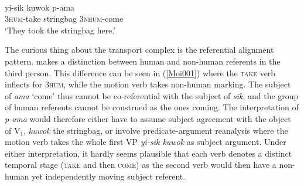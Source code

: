 \ea \label{Moi001}
\\
\gll yi-sik kuwok p-ama \\
\textsc{3}\textsc{hum}-take stringbag \textsc{3}\textsc{nhum}-come \\
\glft `They took the stringbag here.'\\ 
\z

The curious thing about the  transport complex is the referential alignment pattern.  makes a distinction between human and non-human referents in the third person. This difference can be seen in (\ref{Moi001}) where the \textsc{take} verb inflects for 3\textsc{hum}, while the motion verb takes non-human marking. The subject of \textit{ama} `come' thus cannot be co-referential with the subject of \textit{sik}, and the group of human referents cannot be construed as the ones coming. The interpretation of \textit{p-ama} would therefore either have to assume subject agreement with the object of V$_{1}$, \textit{kuwok} the stringbag, or involve predicate-argument reanalysis where the motion verb takes the whole first VP \textit{yi-sik kuwok} as subject argument. Under either interpretation, it hardly seems plausible that each verb denotes a distinct temporal stage (\textsc{take} and then \textsc{come}) as the second verb would then have a non-human yet independently moving subject referent.

